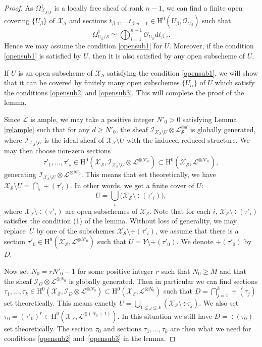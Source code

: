 \documentclass[JEP,XML,SOM,Unicode,published]{cedram}
\theoremstyle{plain}
\theoremstyle{definition}
\newcommand{\ho}{\mathrm{H}}
\newcommand{\X}{\mathcal{X}}
\newcommand{\Li}{\overline{\mathcal{L}}{}}
\newcommand{\li}{\mathcal{L}}
\begin{document}
\begin{proof}[Proof]
As $\Omega^1_{\X_{\mathcal{S}/\mathcal{S}}}$ is a locally free sheaf of rank $n-1$,
we can find a finite open covering $\{U_{\beta}\}$ of $\X_{\mathcal{S}}$ and sections $t_{\beta,1},\dots t_{\beta,n-1}\in \ho^0(U_{\beta}, \mathcal{O}_{U_{\beta}})$ such that
\[
\Omega^1_{U_{\beta}/\mathcal{S}}\simeq \bigoplus_{i=1}^{n-1} \mathcal{O}_{U_{\beta}}\mathrm{d} t_{\beta,i}.
\]
Hence we may assume the condition \eqref{opensub1} for $U$. Moreover, if the condition \eqref{opensub1} is satisfied by $U$, then it is also satisfied by any open subscheme of $U$.

If $U$ is an open subscheme of $\X_{\mathcal{S}}$ satisfying the condition \eqref{opensub1}, we will show that it can be covered by finitely many open subschemes $\{U_{\alpha}\}$ of $U$ which satisfy the conditions \eqref{opensub2} and \eqref{opensub3}. This will complete the proof of the lemma.

Since $\Li$ is ample, we may take a positive integer $N'_0>0$ satisfying Lemma \ref{relample} such that for any $d\geq N'_0$, the sheaf $\mathcal{I}_{\X_{\mathcal{S}}\setminus U}\otimes \li_{\mathcal{S}}^{\otimes d}$ is globally generated, where $\mathcal{I}_{\X_{\mathcal{S}}\setminus U}$ is the ideal sheaf of $\X_{\mathcal{S}}\setminus U$ with the induced reduced structure. We may then choose non-zero sections
\[
\tau'_{1},\dots, \tau'_s\in \ho^0(\X_{\mathcal{S}}, \mathcal{I}_{\X_{\mathcal{S}}\setminus U}\otimes \li^{\otimes N'_0})\subset \ho^0(\X_{\mathcal{S}}, \li^{\otimes N'_0}),
\]
generating $\mathcal{I}_{\X_{\mathcal{S}}\setminus U}\otimes \li^{\otimes N'_0}$. This means that set theoretically, we have $\X_{\mathcal{S}}\setminus U=\bigcap_{i}\div (\tau'_i)$. In other words, we get a finite cover of $U$:
\[
U=\bigcup_{i}\big(\X_{\mathcal{S}}\setminus \div (\tau'_i) \big),
\]
where $\X_{\mathcal{S}}\setminus \div (\tau'_i)$ are open subschemes of $\X_{\mathcal{S}}$. Note that for each $i$, $\X_{\mathcal{S}}\setminus \div (\tau'_i)$ satisfies the condition (1) of the lemma. Without loss of generality, we may replace~$U$ by one of the subschemes $\X_{\mathcal{S}}\setminus \div (\tau'_i)$, \ie we assume that there is a section $\tau'_0\in \ho^0(\X_{\mathcal{S}}, \li^{\otimes N'_0})$ such that $U=Y\setminus\div (\tau'_0)$. We denote $\div (\tau'_0)$ by $D$.

Now set $N_0=r N'_0-1$ for some positive integer $r$ such that $N_0\geq M$ and that the sheaf $\mathcal{I}_D\otimes \li^{\otimes N_0}$ is globally generated. Then in particular we can find sections $\tau_1,\dots, \tau_k\in \ho^0(\X_{\mathcal{S}}, \mathcal{I}_D\otimes \li^{\otimes N_0})\subset \ho^0(\X_{\mathcal{S}}, \li^{\otimes N_0})$ such that $D=\bigcap_{j=1}^k\div (\tau_j)$ set theoretically. This means exactly $U=\bigcup_{1\leq j\leq k}(\X_{\mathcal{S}}\setminus \div \tau_{j})$. We also set $\tau_0=(\tau'_0)^r\in \ho^0(\X_{\mathcal{S}}, \li^{\otimes (N_0+1)})$. In this situation we still have $D=\div (\tau_0)$ set theoretically. The section $\tau_0$ and sections $\tau_1,\dots, \tau_k$ are then what we need for conditions \eqref{opensub2} and~\eqref{opensub3} in the lemma.
\end{proof}
\end{document}
